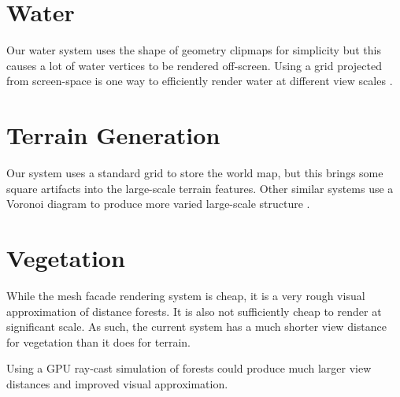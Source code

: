 \section{Water}

Our water system uses the shape of geometry clipmaps for simplicity but this causes a lot of water vertices to be rendered off-screen.
Using a grid projected from screen-space is one way to efficiently render water at different view scales \cite{bruneton_water}.


\section{Terrain Generation}

Our system uses a standard grid to store the world map, but this brings some square artifacts into the large-scale terrain features.
Other similar systems use a Voronoi diagram to produce more varied large-scale structure \cite{polygonal_map}.


\section{Vegetation}

While the mesh facade rendering system is cheap, it is a very rough visual approximation of distance forests.
It is also not sufficiently cheap to render at significant scale.
As such, the current system has a much shorter view distance for vegetation than it does for terrain.

Using a GPU ray-cast simulation of forests could produce much larger view distances and improved visual approximation. \cite{terraintreecast}

